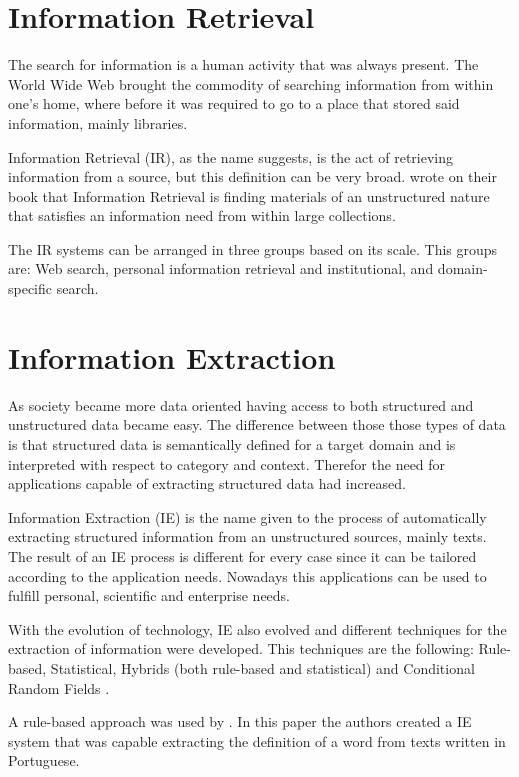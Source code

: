 \section{Information Retrieval}

The search for information is a human activity that was always present.
The World Wide Web brought the commodity of searching information from within one's home, where before it was required to go to a place that stored said information, mainly libraries.

Information Retrieval (IR), as the name suggests, is the act of retrieving information from a source, but this definition can be very broad.
\textcite{manning_2008} wrote on their book that Information Retrieval is finding materials of an unstructured nature that satisfies an information need from within large collections.

The IR systems can be arranged in three groups based on its scale.
This groups are: Web search, personal information retrieval and institutional, and domain-specific search.

\section{Information Extraction}

As society became more data oriented having access to both structured and unstructured data became easy.
The difference between those those types of data is that structured data is semantically defined for a target domain and is interpreted with respect to category and context.
Therefor the need for applications capable of extracting structured data had increased.

Information Extraction (IE) is the name given to the process of automatically extracting structured information from an unstructured sources, mainly texts.
The result of an IE process is different for every case since it can be tailored according to the application needs.
Nowadays this applications can be used to fulfill personal, scientific and enterprise needs.

With the evolution of technology, IE also evolved and different techniques for the extraction of information were developed.
This techniques are the following: Rule-based, Statistical, Hybrids (both rule-based and statistical) and Conditional Random Fields \autocite{sarawagi_2008}.

A rule-based approach was used by \textcite{gaudio_2007}.
In this paper the authors created a IE system that was capable extracting the definition of a word from texts written in Portuguese.

